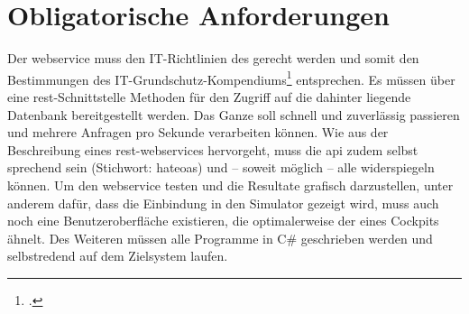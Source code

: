\section{Obligatorische Anforderungen}\label{sec:obligatorische-anforderungen}

	Der \gls{webservice} muss den IT-Richtlinien des
	 gerecht werden
	und somit den Bestimmungen des IT-Grundschutz-Kompendiums\footcite[][]{holgerschildt2022} entsprechen.
	Es müssen über eine \gls{rest}-Schnittstelle Methoden für den Zugriff
	auf die dahinter liegende Datenbank bereitgestellt werden.
	Das Ganze soll schnell und zuverlässig passieren und mehrere Anfragen pro Sekunde verarbeiten können.
	Wie aus der Beschreibung eines \gls{rest}-\glspl{webservice} hervorgeht,
	muss die \gls{api} zudem selbst sprechend sein (Stichwort: \gls{hateoas}) und
	-- soweit möglich --
	alle \crudOperationen{} widerspiegeln können.
	Um den \gls{webservice} testen und die Resultate grafisch darzustellen,
	unter anderem dafür,
	dass die Einbindung in den Simulator gezeigt wird,
	muss auch noch eine Benutzeroberfläche existieren,
	die optimalerweise der eines Cockpits ähnelt.
	Des Weiteren müssen alle Programme in C\# geschrieben werden
	und selbstredend auf dem Zielsystem laufen.